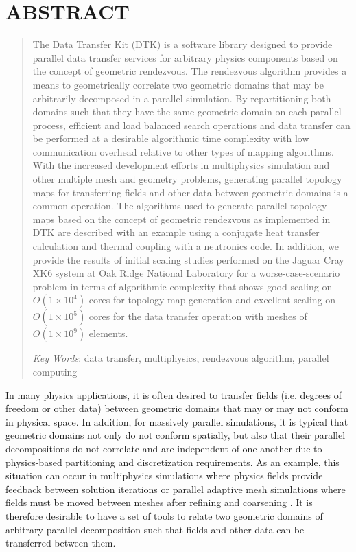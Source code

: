 \documentclass{mc2013}
\begin{document}
\section*{ABSTRACT} 
\begin{quote}
\begin{small}
The Data Transfer Kit (DTK) is a software library designed to provide
parallel data transfer services for arbitrary physics components based
on the concept of geometric rendezvous. The rendezvous algorithm
provides a means to geometrically correlate two geometric domains that
may be arbitrarily decomposed in a parallel simulation. By
repartitioning both domains such that they have the same geometric
domain on each parallel process, efficient and load balanced search
operations and data transfer can be performed at a desirable
algorithmic time complexity with low communication overhead relative
to other types of mapping algorithms. With the increased development
efforts in multiphysics simulation and other multiple mesh and
geometry problems, generating parallel topology maps for transferring
fields and other data between geometric domains is a common
operation. The algorithms used to generate parallel topology maps
based on the concept of geometric rendezvous as implemented in DTK are
described with an example using a conjugate heat transfer calculation
and thermal coupling with a neutronics code. In addition, we provide
the results of initial scaling studies performed on the Jaguar Cray
XK6 system at Oak Ridge National Laboratory for a worse-case-scenario
problem in terms of algorithmic complexity that shows good scaling on
$O(1 \times 10^4)$ cores for topology map generation and excellent
scaling on $O(1 \times 10^5)$ cores for the data transfer operation
with meshes of $O(1 \times 10^9)$ elements.


\emph{Key Words}: data transfer, multiphysics, rendezvous algorithm,
parallel computing
\end{small} 
\end{quote}

\setlength{\baselineskip}{14pt}
\normalsize

\label{sec:intro}

In many physics applications, it is often desired to transfer fields
(i.e. degrees of freedom or other data) between geometric domains that
may or may not conform in physical space. In addition, for massively
parallel simulations, it is typical that geometric domains not only do
not conform spatially, but also that their parallel decompositions do
not correlate and are independent of one another due to physics-based
partitioning and discretization requirements. As an example, this
situation can occur in multiphysics simulations where physics fields
provide feedback between solution iterations \cite{Tautges_2009_2} or
parallel adaptive mesh simulations where fields must be moved between
meshes after refining and coarsening \cite{Edwards_2006}. It is
therefore desirable to have a set of tools to relate two geometric
domains of arbitrary parallel decomposition such that fields and other
data can be transferred between them.
\end{document}
